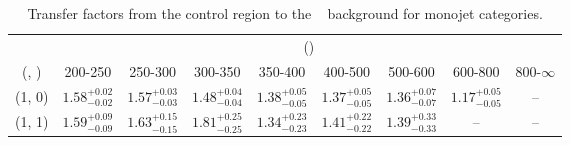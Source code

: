 \begin{table}[h!]
\tiny
\centering
\caption{Transfer factors from the \mj control region to the \zInv~ background for monojet categories.\label{tab:tf_mu_zinv_mono}}
\begin{tabular}
{ccccccccc}
	\hline\hline
	& \multicolumn{8}{c}{\scalht (\gev)} \\ 
	 (\njet,  \nb) & 200-250 & 250-300 & 300-350 & 350-400 & 400-500 & 500-600 & 600-800 & 800-$\infty$ \\ [0.8ex] 
\hline
	(1, 0) & $1.58^{+ 0.02 }_{- 0.02 }$ & $1.57^{+ 0.03 }_{- 0.03 }$ & $1.48^{+ 0.04 }_{- 0.04 }$ & $1.38^{+ 0.05 }_{- 0.05 }$ & $1.37^{+ 0.05 }_{- 0.05 }$ & $1.36^{+ 0.07 }_{- 0.07 }$ & $1.17^{+ 0.05 }_{- 0.05 }$ & -- \\[0.5ex] 
	(1, 1) & $1.59^{+ 0.09 }_{- 0.09 }$ & $1.63^{+ 0.15 }_{- 0.15 }$ & $1.81^{+ 0.25 }_{- 0.25 }$ & $1.34^{+ 0.23 }_{- 0.23 }$ & $1.41^{+ 0.22 }_{- 0.22 }$ & $1.39^{+ 0.33 }_{- 0.33 }$ & -- & -- \\[0.5ex] 
	\hline
	\hline
\end{tabular}
\end{table}
